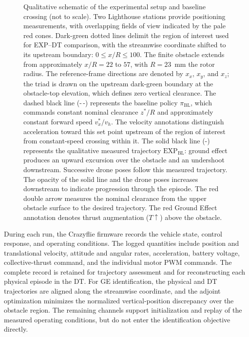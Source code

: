 \documentclass[journal]{IEEEtran}
\begin{document}
\begin{figure}[t]
{%
    }
    \caption{Qualitative schematic of the experimental setup and baseline crossing (not to scale). Two Lighthouse stations provide positioning measurements, with overlapping fields of view indicated by the pale red cones. Dark-green dotted lines delimit the region of interest used for EXP--DT comparison, with the streamwise coordinate shifted to its upstream boundary: $0\leq x/R\leq100$. The finite obstacle extends from approximately $x/R=22$ to $57$, with $R=23$~mm the rotor radius. The reference-frame directions are denoted by $x_x$, $x_y$, and $x_z$; the triad is drawn on the upstream dark-green boundary at the obstacle-top elevation, which defines zero vertical clearance. The dashed black line (\mbox{-\,-}) represents the baseline policy $\pi_{\mathrm{BL}}$, which commands constant nominal clearance $z^\ast/R$ and approximately constant forward speed $v_x^\ast/v_h$. The velocity annotations distinguish acceleration toward this set point upstream of the region of interest from constant-speed crossing within it. The solid black line (\mbox{-}) represents the qualitative measured trajectory $\mathrm{EXP}_{\mathrm{BL}}$: ground effect produces an upward excursion over the obstacle and an undershoot downstream. Successive drone poses follow this measured trajectory. The opacity of the solid line and the drone poses increases downstream to indicate progression through the episode. The red double arrow measures the nominal clearance from the upper obstacle surface to the desired trajectory. The red Ground Effect annotation denotes thrust augmentation ($T\uparrow$) above the obstacle.}
    \label{fig:experimental_setup}
\end{figure}

During each run, the Crazyflie firmware records the vehicle state, control response, and operating conditions. The logged quantities include position and translational velocity, attitude and angular rates, acceleration, battery voltage, collective-thrust command, and the individual motor PWM commands. The complete record is retained for trajectory assessment and for reconstructing each physical episode in the DT. For GE identification, the physical and DT trajectories are aligned along the streamwise coordinate, and the adjoint optimization minimizes the normalized vertical-position discrepancy over the obstacle region. The remaining channels support initialization and replay of the measured operating conditions, but do not enter the identification objective directly.
\end{document}
